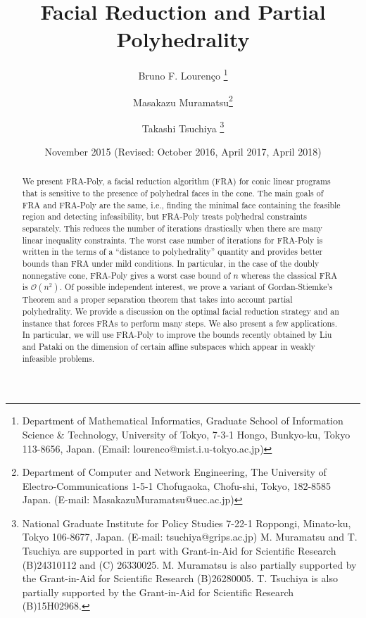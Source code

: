 \documentclass{article}
\title{Facial Reduction and Partial Polyhedrality}
\author{Bruno F. Louren\c{c}o
\thanks{Department of Mathematical Informatics, Graduate School of Information Science \& Technology, University of Tokyo, 7-3-1 Hongo, Bunkyo-ku, Tokyo 113-8656, Japan.
	(Email: \mbox{lourenco@mist.i.u-tokyo.ac.jp})}
        \and
        Masakazu Muramatsu\thanks{
                     Department of Computer and Network Engineering, The University of Electro-Communications 1-5-1 Chofugaoka, Chofu-shi, Tokyo, 182-8585 Japan. (E-mail: \mbox{MasakazuMuramatsu@uec.ac.jp})
                  }
         \and       
                Takashi Tsuchiya
\thanks{
National Graduate Institute for Policy Studies 7-22-1 Roppongi, Minato-ku, Tokyo 106-8677, Japan. (E-mail: \mbox{tsuchiya@grips.ac.jp}) \newline M. Muramatsu and T. Tsuchiya are supported in part with Grant-in-Aid for Scientific Research (B)24310112 and 
(C) 26330025. M. Muramatsu is  also partially supported by the
Grant-in-Aid for Scientific Research (B)26280005. T. Tsuchiya is also partially supported by the Grant-in-Aid for Scientific Research (B)15H02968.
                  }
        }
\date{November 2015 (Revised: October 2016, April 2017, April 2018)}
\begin{document}
\maketitle
\begin{abstract}
We present FRA-Poly, a facial reduction algorithm (FRA) for conic linear programs 
that is sensitive to the presence of polyhedral faces in the cone. 
The main goals of FRA and FRA-Poly are the same, i.e., 
finding the minimal face containing the feasible region and detecting
infeasibility, but FRA-Poly treats polyhedral constraints separately.  
This reduces the number of iterations drastically when there are many linear 
inequality constraints.
The worst case number of iterations for FRA-Poly is written in the terms of a 
``distance to polyhedrality'' quantity and 
provides better bounds than FRA under mild conditions. In particular, in the case 
of the doubly nonnegative cone, FRA-Poly gives a worst case bound of $n$ whereas the classical FRA is $\mathcal{O}(n^2)$. 
Of possible independent interest, we  prove a variant 
of Gordan-Stiemke's Theorem and a proper separation theorem that takes into account partial polyhedrality. We provide a discussion on the optimal facial reduction 
strategy and an instance that forces FRAs to perform many steps. 
We also present a few applications. In particular, we will use 
FRA-Poly to improve the bounds recently obtained 
by Liu and Pataki on the dimension of certain affine subspaces which appear in 
weakly infeasible problems.  
\end{abstract}
\end{document}
